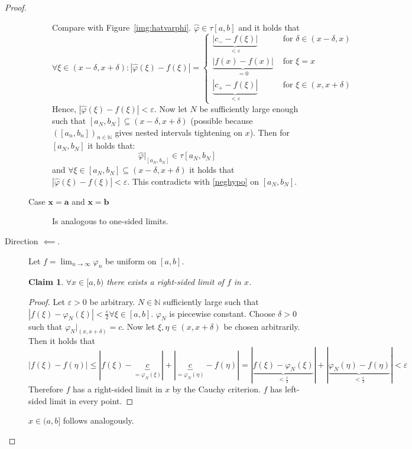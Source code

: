 \documentclass{article}
\newtheorem*{claim}{Claim}%
\newcommand{\card}[1]{\left|#1\right|}
\begin{document}
\begin{proof}
\begin{description}
\begin{description}
          Compare with Figure~\ref{img:hatvarphi}.
          $\hat{\varphi} \in \tau[a,b]$ and it holds that
          \[
            \forall \xi \in (x - \delta, x + \delta):
            \card{\hat\varphi(\xi) - f(\xi)} = \begin{cases}
              \underbrace{\card{c_- - f(\xi)}}_{< \varepsilon} & \text{ for } \delta \in (x - \delta, x) \\
              \underbrace{\card{f(x) - f(x)}}_{= 0} & \text{ for } \xi = x \\
              \underbrace{\card{c_+ - f(\xi)}}_{< \varepsilon} & \text{ for } \xi \in (x, x + \delta)
            \end{cases}
          \]
          Hence, $\card{\hat\varphi(\xi) - f(\xi)} < \varepsilon$.
          Now let $N$ be sufficiently large enough such that $[a_N, b_N] \subseteq (x - \delta, x + \delta)$
          (possible because $([a_n, b_n])_{n \in \mathbb N}$ gives nested intervals tightening on $x$).
          Then for $[a_N, b_N]$ it holds that:
          \[ \hat\varphi|_{[a_N, b_N]} \in \tau[a_N, b_N] \]
          and $\forall \xi \in [a_N, b_N] \subseteq (x - \delta, x + \delta)$ it holds that
          $\card{\hat{\varphi}(\xi) - f(\xi)} < \varepsilon$. This contradicts with \eqref{neghypo} on $[a_N, b_N]$.
        \item[Case $\mathbf{x = a}$ and $\mathbf{x = b}$]
          Is analogous to one-sided limits.
      \end{description}
    \item[Direction $\impliedby$.]
      Let $f = \lim_{n\to\infty} \varphi_n$ be uniform on $[a,b]$.

      \begin{claim}
        $\forall x \in [a,b)$ there exists a right-sided limit of $f$ in $x$.
      \end{claim}

      \begin{proof}
        Let $\varepsilon > 0$ be arbitrary. $N \in \mathbb N$ sufficiently large such that
        $\card{f(\xi) - \varphi_N(\xi)} < \frac\varepsilon2 \forall \xi \in [a,b]$.
        $\varphi_N$ is piecewise constant. Choose $\delta > 0$ such that
        $\varphi_N|_{(x, x+\delta)} = c$.
        Now let $\xi, \eta \in (x, x+\delta)$ be chosen arbitrarily.
        Then it holds that
        \[
          \card{f(\xi) - f(\eta)} \leq |{f(\xi) - \underbrace{c}_{= \varphi_N(\xi)}}| + |{\underbrace{c}_{= \varphi_N(\eta)} - f(\eta)}|
          = |{\underbrace{f(\xi) - \varphi_N(\xi)}_{< \frac\varepsilon2}}| + |{\underbrace{\varphi_N(\eta) - f(\eta)}_{< \frac\varepsilon2}}| < \varepsilon
        \]
        Therefore $f$ has a right-sided limit in $x$ by the Cauchy criterion.
        $f$ has left-sided limit in every point.
      \end{proof}
      $x \in (a, b]$ follows analogously.
  \end{description}
\end{proof}
\end{document}
